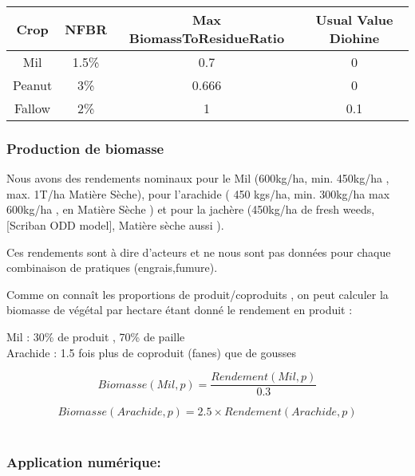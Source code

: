 \documentclass[10pt,a4paper,french]{article} %
\begin{document}
\begin{table}[h!]
\begin{tabular}{|c|c|c|c|}
\hline
\textbf{Crop}          & \textbf{NFBR}    & \textbf{Max BiomassToResidueRatio} & \textbf{Usual Value Diohine}  \\ \hline
Mil                    & 1.5\%                 & 0.7                                  &  0 \\ \hline
Peanut                 & 3\%                   & 0.666                               &  0 \\ \hline
Fallow                 & 2\%                   & 1                                   &  0.1 \\\hline
\end{tabular}
\end{table}




\subsubsection{Production de biomasse}


Nous avons des rendements nominaux pour le Mil (600kg/ha, min. 450kg/ha , max. 1T/ha Matière Sèche), pour l'arachide ( 450 kgs/ha, min. 300kg/ha max 600kg/ha , en Matière Sèche ) et pour la jachère (450kg/ha de fresh weeds, [Scriban ODD model], Matière sèche aussi  ).

Ces rendements sont à dire d'acteurs et ne nous sont pas données pour chaque combinaison de pratiques (engrais,fumure).

Comme on connaît les proportions de  produit/coproduits , on peut calculer la biomasse de végétal par hectare étant donné le rendement en produit : 

Mil : 30\% de produit ,  70\% de paille \\
Arachide : 1.5 fois plus de coproduit (fanes) que de gousses

\begin{equation}
Biomasse(Mil,p) =  \frac{Rendement(Mil,p)}{0.3}
\end{equation}

\begin{equation}
Biomasse(Arachide,p) =  2.5 \times Rendement(Arachide,p)
\end{equation}\\





\subsubsection{Application numérique:} 
\end{document}
